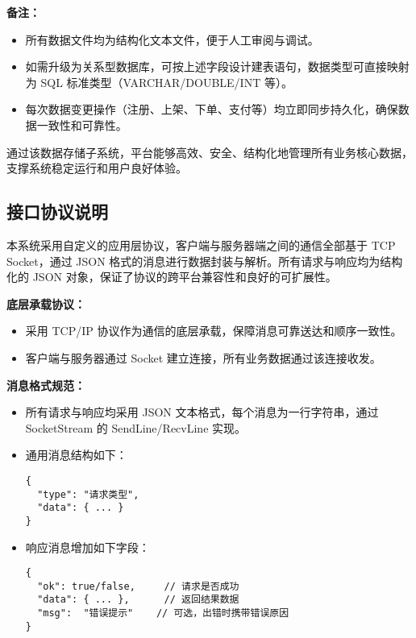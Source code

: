 \documentclass[11pt]{article}
\begin{document}
\vspace{0.5em}
\textbf{备注：}
\begin{itemize}
    \item 所有数据文件均为结构化文本文件，便于人工审阅与调试。
    \item 如需升级为关系型数据库，可按上述字段设计建表语句，数据类型可直接映射为 SQL 标准类型（VARCHAR/DOUBLE/INT 等）。
    \item 每次数据变更操作（注册、上架、下单、支付等）均立即同步持久化，确保数据一致性和可靠性。
\end{itemize}

\vspace{0.5em}
通过该数据存储子系统，平台能够高效、安全、结构化地管理所有业务核心数据，支撑系统稳定运行和用户良好体验。

\subsection{接口协议说明}

本系统采用自定义的应用层协议，客户端与服务器端之间的通信全部基于 TCP Socket，通过 JSON 格式的消息进行数据封装与解析。所有请求与响应均为结构化的 JSON 对象，保证了协议的跨平台兼容性和良好的可扩展性。

\vspace{0.5em}
\textbf{底层承载协议：}
\begin{itemize}
    \item 采用 TCP/IP 协议作为通信的底层承载，保障消息可靠送达和顺序一致性。
    \item 客户端与服务器通过 Socket 建立连接，所有业务数据通过该连接收发。
\end{itemize}

\vspace{0.5em}
\textbf{消息格式规范：}
\begin{itemize}
    \item 所有请求与响应均采用 JSON 文本格式，每个消息为一行字符串，通过 SocketStream 的 SendLine/RecvLine 实现。
    \item 通用消息结构如下：
\begin{verbatim}
{
  "type": "请求类型",
  "data": { ... }
}
\end{verbatim}
    \item 响应消息增加如下字段：
\begin{verbatim}
{
  "ok": true/false,     // 请求是否成功
  "data": { ... },      // 返回结果数据
  "msg":  "错误提示"    // 可选，出错时携带错误原因
}
\end{verbatim}
\end{itemize}
\end{document}
